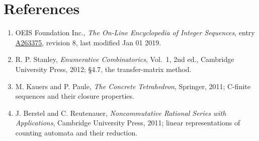 \documentclass[11pt]{article}
\theoremstyle{definition}
\begin{document}
\section{References}

\begin{enumerate}

\item OEIS Foundation Inc., \emph{The On-Line Encyclopedia of Integer Sequences}, entry \href{https://oeis.org/A263375}{A263375}, revision 8, last modified Jan 01 2019.

\item R. P. Stanley, \emph{Enumerative Combinatorics}, Vol.~1, 2nd ed., Cambridge University Press, 2012; \S4.7, the transfer-matrix method.

\item M. Kauers and P. Paule, \emph{The Concrete Tetrahedron}, Springer, 2011; C-finite sequences and their closure properties.

\item J. Berstel and C. Reutenauer, \emph{Noncommutative Rational Series with Applications}, Cambridge University Press, 2011; linear representations of counting automata and their reduction.

\end{enumerate}
\end{document}
